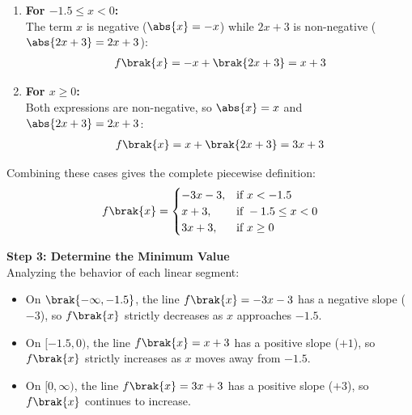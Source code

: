 \begin{enumerate}
\begin{enumerate}
    \item \textbf{For $-1.5 \le x < 0$:} \\
    The term $x$ is negative ($\abs{x} = -x$) while $2x+3$ is non-negative ($\abs{2x+3} = 2x+3$):
    \begin{align}
    f\brak{x} = -x + \brak{2x + 3} = x + 3
    \end{align}

    \item \textbf{For $x \ge 0$:} \\
    Both expressions are non-negative, so $\abs{x} = x$ and $\abs{2x+3} = 2x+3$:
    \begin{align}
    f\brak{x} = x + \brak{2x + 3} = 3x + 3
    \end{align}
\end{enumerate}

Combining these cases gives the complete piecewise definition:
\begin{align}
f\brak{x} = \begin{cases} 
-3x - 3, & \text{if } x < -1.5 \\
x + 3, & \text{if } -1.5 \le x < 0 \\
3x + 3, & \text{if } x \ge 0 
\end{cases}
\end{align}

\noindent \textbf{Step 3: Determine the Minimum Value}\\
Analyzing the behavior of each linear segment:
\begin{itemize}
    \item On $\brak{-\infty, -1.5}$, the line $f\brak{x} = -3x - 3$ has a negative slope ($-3$), so $f\brak{x}$ strictly decreases as $x$ approaches $-1.5$.
    \item On $[-1.5, 0)$, the line $f\brak{x} = x + 3$ has a positive slope ($+1$), so $f\brak{x}$ strictly increases as $x$ moves away from $-1.5$.
    \item On $[0, \infty)$, the line $f\brak{x} = 3x + 3$ has a positive slope ($+3$), so $f\brak{x}$ continues to increase.
\end{itemize}


\end{enumerate}
